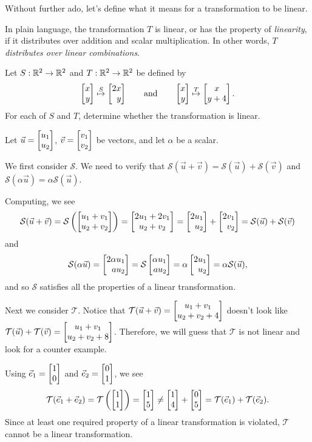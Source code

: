 Without further ado, let's define what it means for a transformation to be linear.


In plain language, the transformation $T$ is linear, or has the property of \emph{linearity},
if it distributes over addition and scalar multiplication.
In other words, $T$ \emph{distributes over linear combinations}.

\begin{example}
	Let $S:\mathbb{R}^2\to\mathbb{R}^2$ and $T:\mathbb{R}^2\to\mathbb{R}^2$ be defined by
	\[
		\mat{x\\y}\stackrel{S}{\mapsto}\mat{2x\\y}\qquad\text{and}\qquad
		\mat{x\\y}\stackrel{T}{\mapsto}\matc{x\\y+4}.
	\]
	For each of $S$ and $T$, determine whether the transformation is linear.
	
	Let $\vec u=\mat{u_1\\u_2}$, $\vec v=\mat{v_1\\v_2}$ be vectors, and let $\alpha$ be a scalar.

	We first consider $\mathcal S$.
	We need to verify that $\mathcal S(\vec u+\vec v)=\mathcal S(\vec u)+\mathcal S(\vec v)$ 
	and $\mathcal S(\alpha\vec u)=\alpha\mathcal S(\vec u)$. 
	
	Computing, we see
	\[
	    \mathcal S(\vec u +\vec v)=\mathcal S\left(\mat{u_1+v_1\\u_2+v_2}\right)=\matc{2u_1+2v_1\\u_2+v_2}=\mat{2u_1\\u_2}+\mat{2v_1\\v_2}=\mathcal S(\vec u) + \mathcal S(\vec v)
	\]
	and
	\[
		\mathcal S(\alpha\vec u)=\mat{2\alpha u_1\\a u_2}=\mathcal S\mat{\alpha u_1\\a u_2}=\alpha\mat{2 u_1\\ u_2}=\alpha\mathcal S(\vec u),
	\]
	and so $\mathcal S$ satisfies all the properties of a linear transformation.
	
	\medskip
	Next we consider $\mathcal T$.
	Notice that $\mathcal T(\vec u+\vec v)=\begin{bmatrix}u_1+v_1\\u_2+v_2+4\end{bmatrix}$ doesn't 
	look like $\mathcal T(\vec u)+\mathcal T(\vec v)=\begin{bmatrix}u_1+v_1\\u_2+v_2+8\end{bmatrix}$. 
	Therefore, we will guess that $\mathcal T$ is not linear and look for a counter example. 
	
	Using $\xhat=\mat{1\\0}$ and $\yhat=\mat{0\\1}$, we see
	\[
	    \mathcal T(\xhat +\yhat)=\mathcal T\left(\mat{1\\1}\right)=\mat{1\\5} \neq \mat{1\\4}+\mat{0\\5}=\mathcal T(\xhat) + \mathcal T(\yhat).
	\]
	Since at least one required property of a linear transformation is violated, $\mathcal T$ cannot be a linear transformation.
\end{example}

